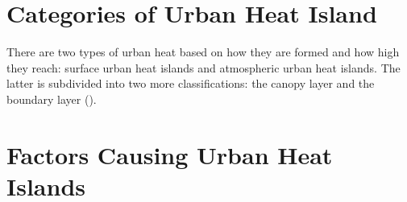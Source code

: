 \section{Categories of Urban Heat Island}

There are two types of urban heat based on how they are formed and how high they reach:
surface urban heat islands and atmospheric urban heat islands.
The latter is subdivided into two more classifications:
the canopy layer and the boundary layer (\cite{Zhou2018}).

\section{Factors Causing Urban Heat Islands}

